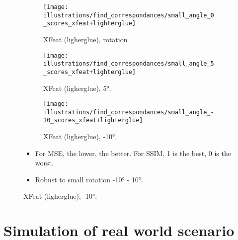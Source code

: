\documentclass[aspectratio=169,hyperref={pdfpagelabels=false}]{beamer}
\begin{document}
    \begin{frame}
        \begin{figure}[ht!]
            \centering
            \begin{subfigure}[t]{0.32\textwidth}
                \texttt{[image: illustrations/find\_correspondances/small\_angle\_0\_scores\_xfeat+lighterglue]}
                \caption{XFeat (ligherglue), rotation}
                \label{fig:find_corr:small_angles:mse_ssim_xfeat+lg_0}
            \end{subfigure}
            \hfill
            \begin{subfigure}[t]{0.32\textwidth}
                \texttt{[image: illustrations/find\_correspondances/small\_angle\_5\_scores\_xfeat+lighterglue]}
                \caption{XFeat (ligherglue), 5°.}
                \label{fig:find_corr:small_angles:mse_ssim_xfeat+lg_5}
            \end{subfigure}
            \hfill
            \begin{subfigure}[t]{0.32\textwidth}
                \texttt{[image: illustrations/find\_correspondances/small\_angle\_-10\_scores\_xfeat+lighterglue]}
                \caption{XFeat (ligherglue), -10°.}
                \label{fig:find_corr:small_angles:mse_ssim_xfeat+lg_-10}
            \end{subfigure}

            \begin{itemize}
                \item For MSE, the lower, the better. For SSIM, 1 is the best, 0 is the worst.
                \item Robust to small rotation -10° - 10°.
            \end{itemize}
        \end{figure}
    \end{frame}
%
%


    \section{Simulation of real world scenario}
    \begin{frame}[tocremainder]
        \tableofcontents[currentsection]
    \end{frame}
\end{document}
